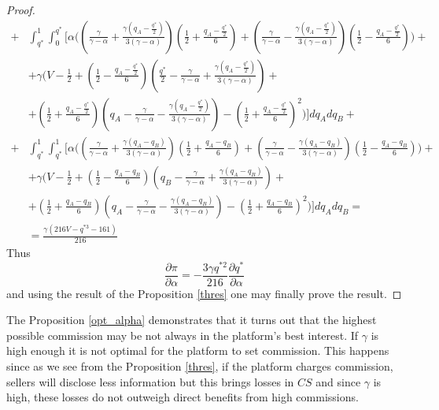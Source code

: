 \documentclass[a4paper]{article}
\begin{document}
\begin{proof}
\begin{align*}
	 +
	 &\int_{q^*}^{1} \int_{0}^{q^*} \biggl[ \alpha \biggl( \left( \frac{\gamma}{\gamma - \alpha} + \frac{\gamma\left(q_A - \frac{q^*}{2} \right) }{3(\gamma - \alpha)} \right)\left(\frac{1}{2} + \frac{q_A - \frac{q^*}{2}}{6} \right) + \left( \frac{\gamma}{\gamma - \alpha} - \frac{\gamma\left(q_A- \frac{q^*}{2} \right) }{3(\gamma - \alpha)} \right)\left(\frac{1}{2} - \frac{q_A -\frac{q^*}{2}}{6} \right) \biggr)+\\
	 &+\gamma \biggl(V - \frac{1}{2} + \left(\frac{1}{2} - \frac{q_A-\frac{q^*}{2}}{6} \right) \left( \frac{q^*}{2} - \frac{\gamma}{\gamma - \alpha} + \frac{\gamma \left(q_A -  \frac{q^*}{2} \right)}{3 (\gamma - \alpha)} \right)  + \\
	 &+ \left(\frac{1}{2} + \frac{q_A-\frac{q^*}{2}}{6} \right) \left(q_A - \frac{\gamma}{\gamma - \alpha} - \frac{\gamma \left(q_A- \frac{q^*}{2} \right)}{3(\gamma - \alpha)} \right)  - \left( \frac{1}{2} + \frac{q_A - \frac{q^*}{2}}{6} \right)^2 \biggr)  \biggr] dq_A dq_B + \\
	 +
	  &\int_{q^*}^{1} \int_{q^*}^{1} \biggl[ \alpha \biggl( \left( \frac{\gamma}{\gamma - \alpha} + \frac{\gamma\left(q_A - q_B \right) }{3(\gamma - \alpha)} \right)\left(\frac{1}{2} + \frac{q_A - q_B}{6} \right) + \left( \frac{\gamma}{\gamma - \alpha} - \frac{\gamma\left(q_A- q_B \right) }{3(\gamma - \alpha)} \right)\left(\frac{1}{2} - \frac{q_A -q_B}{6} \right) \biggr)+\\
	 &+\gamma \biggl(V - \frac{1}{2} + \left(\frac{1}{2} - \frac{q_A-q_B}{6} \right) \left( q_B - \frac{\gamma}{\gamma - \alpha} + \frac{\gamma \left(q_A -  q_B \right)}{3 (\gamma - \alpha)} \right)  + \\
	 &+ \left(\frac{1}{2} + \frac{q_A-q_B}{6} \right) \left(q_A - \frac{\gamma}{\gamma - \alpha} - \frac{\gamma \left(q_A- q_B \right)}{3(\gamma - \alpha)} \right)  - \left( \frac{1}{2} + \frac{q_A - q_B}{6} \right)^2 \biggr)  \biggr] dq_A dq_B = \\
	 & = \frac{\gamma(216 V - q^{*3} - 161)}{216}
	\end{align*}
	Thus $$\frac{\partial \pi}{\partial \alpha} = -\frac{3 \gamma q^{*2}}{216} \frac{\partial q^*}{\partial \alpha}$$ and using the result of the Proposition \ref{thres} one may finally prove the result.
\end{proof}

The Proposition \ref{opt_alpha} demonstrates that it turns out that the highest possible commission may be not always in the platform's best interest. If $\gamma$ is high enough it is not optimal for the platform to set commission. This happens since as we see from the Proposition \ref{thres}, if the platform charges commission, sellers will disclose less information but this brings losses in $CS$ and since $\gamma$ is high, these losses do not outweigh direct benefits from high commissions. 
\end{document}
